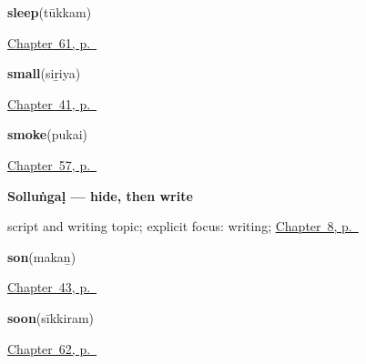 \noindent\begin{minipage}[t]{\linewidth}
\raggedright
\textbf{sleep}\enspace\emph{}\enspace(tūkkam)\par
\footnotesize \hyperref[ch:ta-how-the-body-feels]{Chapter~61, p.~\pageref*{ch:ta-how-the-body-feels}}
\end{minipage}\par\smallskip

\noindent\begin{minipage}[t]{\linewidth}
\raggedright
\textbf{small}\enspace\emph{}\enspace(siṟiya)\par
\footnotesize \hyperref[ch:ta-describing-things]{Chapter~41, p.~\pageref*{ch:ta-describing-things}}
\end{minipage}\par\smallskip

\noindent\begin{minipage}[t]{\linewidth}
\raggedright
\textbf{smoke}\enspace\emph{}\enspace(pukai)\par
\footnotesize \hyperref[ch:ta-wind-and-fire]{Chapter~57, p.~\pageref*{ch:ta-wind-and-fire}}
\end{minipage}\par\smallskip

\noindent\begin{minipage}[t]{\linewidth}
\raggedright
\textbf{Solluṅgaḷ — hide, then write}\par
\footnotesize script and writing topic; explicit focus: writing; \hyperref[ch:ta-please]{Chapter~8, p.~\pageref*{ch:ta-please}}
\end{minipage}\par\smallskip

\noindent\begin{minipage}[t]{\linewidth}
\raggedright
\textbf{son}\enspace\emph{}\enspace(makaṉ)\par
\footnotesize \hyperref[ch:ta-household]{Chapter~43, p.~\pageref*{ch:ta-household}}
\end{minipage}\par\smallskip

\noindent\begin{minipage}[t]{\linewidth}
\raggedright
\textbf{soon}\enspace\emph{}\enspace(sīkkiram)\par
\footnotesize \hyperref[ch:ta-only-and-still]{Chapter~62, p.~\pageref*{ch:ta-only-and-still}}
\end{minipage}\par\smallskip

